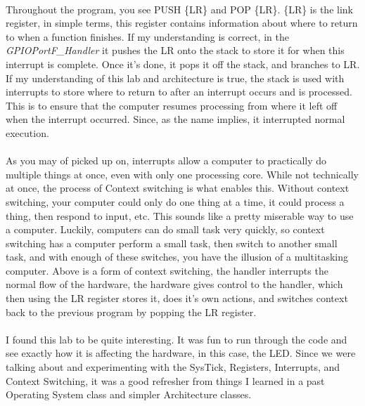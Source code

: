 \documentclass[12pt,a4paper]{report}
\begin{document}
\paragraph{}
Throughout the program, you see PUSH \{LR\} and POP \{LR\}. \{LR\} is the link register, in simple terms, this register contains information about where to return to when a function finishes. If my understanding is correct, in the \textit{GPIOPortF\_Handler} it pushes the LR onto the stack to store it for when this interrupt is complete. Once it's done, it pops it off the stack, and branches to LR. If my understanding of this lab and architecture is true, the stack is used with interrupts to store where to return to after an interrupt occurs and is processed. This is to ensure that the computer resumes processing from where it left off when the interrupt occurred. Since, as the name implies, it interrupted normal execution. 

\paragraph{}
As you may of picked up on, interrupts allow a computer to practically do multiple things at once, even with only one processing core. While not technically at once, the process of Context switching is what enables this. Without context switching, your computer could only do one thing at a time, it could process a thing, then respond to input, etc. This sounds like a pretty miserable way to use a computer. Luckily, computers can do small task very quickly, so context switching has a computer perform a small task, then switch to another small task, and with enough of these switches, you have the illusion of a multitasking computer. Above is a form of context switching, the handler interrupts the normal flow of the hardware, the hardware gives control to the handler, which then using the LR register stores it, does it's own actions, and switches context back to the previous program by popping the LR register. 

\paragraph{}
I found this lab to be quite interesting. It was fun to run through the code and see exactly how it is affecting the hardware, in this case, the LED. Since we were talking about and experimenting with the SysTick, Registers, Interrupts, and Context Switching, it was a good refresher from things I learned in a past Operating System class and simpler Architecture classes. 
\end{document}
